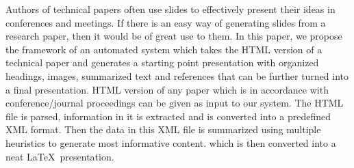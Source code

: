 Authors of technical papers often use slides to effectively present their ideas in
conferences and meetings. If there is an easy way of generating slides from a
research paper, then it would be of great use to them. In this paper, we propose the
framework of an automated system which takes the HTML version of a technical paper and generates a starting point presentation with organized headings, images, summarized
text and references that can be further turned into a final presentation. HTML version
of any paper which is in accordance with conference/journal proceedings can be given
as input to our system. The HTML file is parsed, information in it is extracted and is
converted into a predefined XML format. Then the data in this XML file is summarized
using multiple heuristics to generate most informative content. which is then converted
into a neat \LaTeX\ presentation.